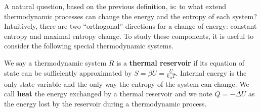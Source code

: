 \documentclass[letterpaper,twocolumn]{article}
\begin{document}
%

A natural question, based on the previous definition, is: to what extend thermodynamic processes can change the energy and the entropy of each system? Intuitively, there are two ``orthogonal'' directions for a change of energy: constant entropy and maximal entropy change. To study these components, it is useful to consider the following special thermodynamic systems.

We say a thermodynamic system $R$ is a \textbf{thermal reservoir} if its equation of state can be sufficiently approximated by $S = \beta U = \frac{U}{k_B T}$. Internal energy is the only state variable and the only way the entropy of the system can change. We call \textbf{heat} the energy exchanged by a thermal reservoir and we note $Q = - \Delta U$ as the energy lost by the reservoir during a thermodynamic process.
\end{document}
